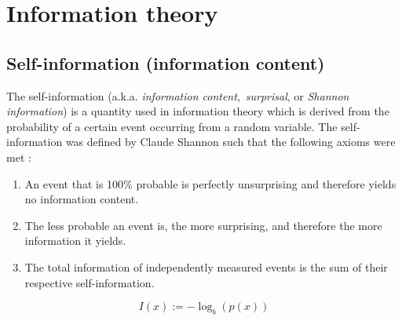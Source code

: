 \newpage\section{Information theory}

\subsection{Self-information (information content)}

The self-information (a.k.a. \textit{information content},~\textit{surprisal},
or \textit{Shannon information}) is a quantity used in information theory which
is derived from the probability of a certain event occurring from a random
variable. The self-information was defined by Claude Shannon such that
the following axioms were met \cite{ElementaryInformationTheory1979}:

\begin{enumerate}
    \item An event that is 100\% probable is perfectly unsurprising and
    therefore yields no information content.
    \item The less probable an event is, the more surprising, and therefore the
    more information it yields.
    \item The total information of independently measured events is the
    sum of their respective self-information.
\end{enumerate}

\begin{equation}
    I(x):=-\log_b(p(x))
\end{equation}






